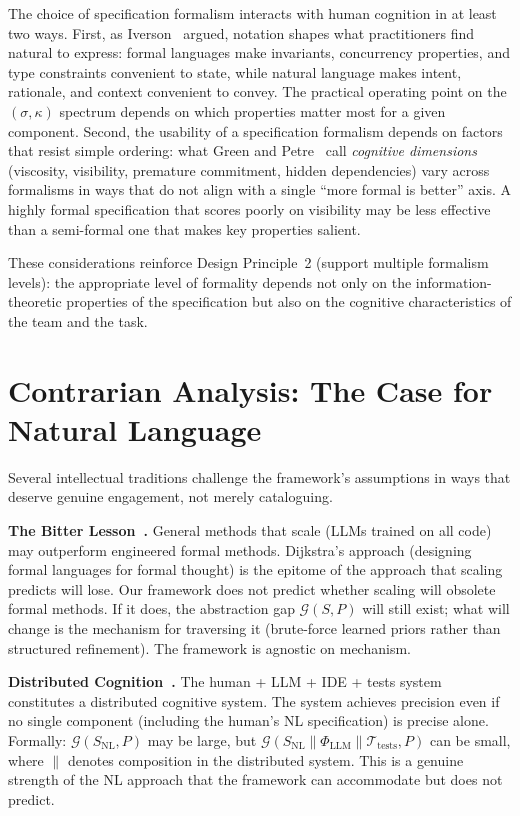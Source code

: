\documentclass[11pt, a4paper, logo, copyright]{googledeepmind}
\begin{document}
The choice of specification formalism interacts with human cognition in at least two ways. First, as Iverson~\citep{iverson1980notation} argued, notation shapes what practitioners find natural to express: formal languages make invariants, concurrency properties, and type constraints convenient to state, while natural language makes intent, rationale, and context convenient to convey. The practical operating point on the $(\sigma, \kappa)$ spectrum depends on which properties matter most for a given component. Second, the usability of a specification formalism depends on factors that resist simple ordering: what Green and Petre~\citep{green1996usability} call \emph{cognitive dimensions} (viscosity, visibility, premature commitment, hidden dependencies) vary across formalisms in ways that do not align with a single ``more formal is better'' axis. A highly formal specification that scores poorly on visibility may be less effective than a semi-formal one that makes key properties salient.

These considerations reinforce Design Principle~2 (support multiple formalism levels): the appropriate level of formality depends not only on the information-theoretic properties of the specification but also on the cognitive characteristics of the team and the task.


\section{Contrarian Analysis: The Case for Natural Language}
\label{sec:contrarian}

Several intellectual traditions challenge the framework's assumptions in ways that deserve genuine engagement, not merely cataloguing.

\textbf{The Bitter Lesson~\citep{sutton2019bitter}.} General methods that scale (LLMs trained on all code) may outperform engineered formal methods. Dijkstra's approach (designing formal languages for formal thought) is the epitome of the approach that scaling predicts will lose. Our framework does not predict whether scaling will obsolete formal methods. If it does, the abstraction gap $\mathcal{G}(S, P)$ will still exist; what will change is the mechanism for traversing it (brute-force learned priors rather than structured refinement). The framework is agnostic on mechanism.

\textbf{Distributed Cognition~\citep{hutchins1995cognition, clark2003natural}.} The human + LLM + IDE + tests system constitutes a distributed cognitive system. The system achieves precision even if no single component (including the human's NL specification) is precise alone. Formally: $\mathcal{G}(S_{\text{NL}}, P)$ may be large, but $\mathcal{G}(S_{\text{NL}} \parallel \Phi_{\text{LLM}} \parallel \mathcal{T}_{\text{tests}}, P)$ can be small, where $\parallel$ denotes composition in the distributed system. This is a genuine strength of the NL approach that the framework can accommodate but does not predict.
\end{document}

